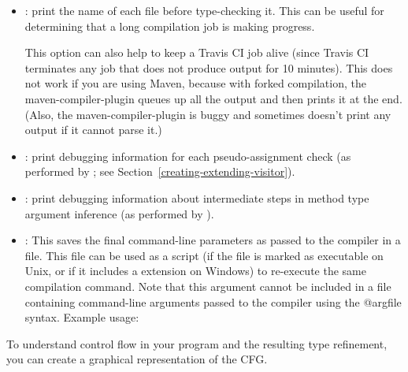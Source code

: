 \begin{itemize}

\item {}: print the name of each file before type-checking it.
This can be useful for determining that a long compilation job is making
progress.

This option can also help to keep a Travis CI job alive (since Travis CI
terminates any job that does not produce output for 10 minutes).
This does not work if you are using Maven, because with forked compilation,
the maven-compiler-plugin queues up all the output and then prints it at the end.
(Also, the maven-compiler-plugin is buggy and sometimes doesn't print any
output if it cannot parse it.)

\item {}: print debugging information for each
pseudo-assignment check (as performed by
; see
Section~\ref{creating-extending-visitor}).

\item {}: print debugging information
about intermediate steps in method type argument inference
(as performed by ).

\end{itemize}


\begin{itemize}

\item {}:
  This saves the final command-line parameters as passed to the compiler in a file.
  This file can be used as a script (if the file is marked as executable on Unix, or
  if it includes a  extension on Windows) to re-execute the same compilation command.
  Note that this argument cannot be included in a file containing command-line arguments
  passed to the compiler using the @argfile syntax.
  Example usage: 

\end{itemize}


To understand control flow in your program and the resulting type
refinement, you can create a graphical representation of the CFG.

